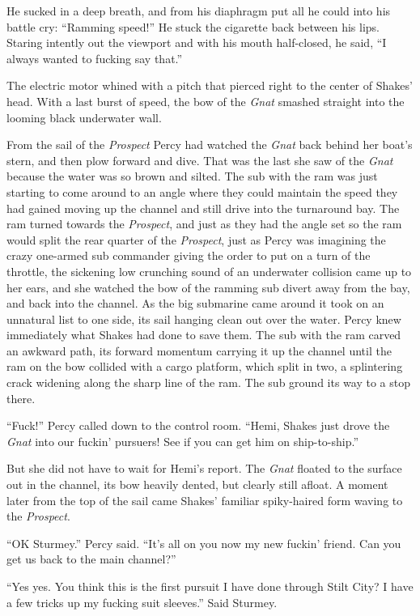 \documentclass[
]{scrbook}
\begin{document}
He sucked in a deep breath, and from his diaphragm put all he could into
his battle cry: ``Ramming speed!'' He stuck the cigarette back between
his lips. Staring intently out the viewport and with his mouth
half-closed, he said, ``I always wanted to fucking say that.''

The electric motor whined with a pitch that pierced right to the center
of Shakes' head. With a last burst of speed, the bow of the \emph{Gnat}
smashed straight into the looming black underwater wall.

From the sail of the \emph{Prospect} Percy had watched the \emph{Gnat}
back behind her boat's stern, and then plow forward and dive. That was
the last she saw of the \emph{Gnat} because the water was so brown and
silted. The sub with the ram was just starting to come around to an
angle where they could maintain the speed they had gained moving up the
channel and still drive into the turnaround bay. The ram turned towards
the \emph{Prospect}, and just as they had the angle set so the ram would
split the rear quarter of the \emph{Prospect}, just as Percy was
imagining the crazy one-armed sub commander giving the order to put on a
turn of the throttle, the sickening low crunching sound of an underwater
collision came up to her ears, and she watched the bow of the ramming
sub divert away from the bay, and back into the channel. As the big
submarine came around it took on an unnatural list to one side, its sail
hanging clean out over the water. Percy knew immediately what Shakes had
done to save them. The sub with the ram carved an awkward path, its
forward momentum carrying it up the channel until the ram on the bow
collided with a cargo platform, which split in two, a splintering crack
widening along the sharp line of the ram. The sub ground its way to a
stop there.

``Fuck!'' Percy called down to the control room. ``Hemi, Shakes just
drove the \emph{Gnat} into our fuckin' pursuers! See if you can get him
on ship-to-ship.''

But she did not have to wait for Hemi's report. The \emph{Gnat} floated
to the surface out in the channel, its bow heavily dented, but clearly
still afloat. A moment later from the top of the sail came Shakes'
familiar spiky-haired form waving to the \emph{Prospect}.

``OK Sturmey.'' Percy said. ``It's all on you now my new fuckin' friend.
Can you get us back to the main channel?''

``Yes yes. You think this is the first pursuit I have done through Stilt
City? I have a few tricks up my fucking suit sleeves.'' Said Sturmey.
\end{document}

